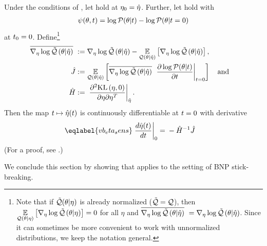 \begin{thm}
%
Under the conditions of , let  hold at
$\eta_0 = \hat\eta$.  Further, let  hold with
%
\begin{align*}
%
\psi(\theta, \t) = \log \p(\theta \vert \t) - \log \p(\theta \vert \t=0)
%
\end{align*}
%
at $t_0 = 0$.
%
Define\footnote{Note that if $\tilde{\mathcal{Q}}(\theta \vert \eta)$ is already normalized
($\tilde{\mathcal{Q}} = \mathcal{Q}$), then $\underset{\mathcal{Q}(\theta \vert \eta)}{\mathbb{E}}\left[{\nabla_\eta \log \tilde{\mathcal{Q}}}\left(\theta \vert \eta\right)\right] =
0$ for all $\eta$ and $\overline{{\nabla_\eta \log \tilde{\mathcal{Q}}}\left(\theta \vert \hat\eta\right)}\,\, = {\nabla_\eta \log \tilde{\mathcal{Q}}}\left(\theta \vert
\hat\eta\right)$. Since it can sometimes be more convenient to work with unnormalized
distributions, we keep the notation general.}
%
\begin{align*}
%
\lqgradbar{\theta \vert \etaopt} :={}&
    \lqgrad{\theta \vert \etaopt} -
    \expect{\q(\theta \vert \etaopt)}{\lqgrad{\theta \vert \etaopt}}, \\
\crosshessian :={}&   \expect{\q(\theta \vert \etaopt)}{
      \lqgradbar{\theta \vert \etaopt}
      \fracat{\partial \log \p(\theta \vert \t)}{\partial \t}{\t=0}} \mathand \\
\hessopt :={}& \fracat{\partial^2 \KL{\eta, 0}}
                      {\partial \eta \partial \eta^T}
                      {\etaopt}.
%
\end{align*}
%
Then the map $t \mapsto \hat\eta(t)$ is continuously differentiable at $t=0$
with derivative
%
\begin{align}\eqlabel{vb_eta_sens}
%
\fracat{d \etaopt(\t)}{d \t}{0} ={}&
    - \hessopt^{-1}
    \crosshessian
%
\end{align}
%
(For a proof, see  .)
%
\end{thm}

We conclude this section by showing that  applies to the
setting of BNP stick-breaking.

